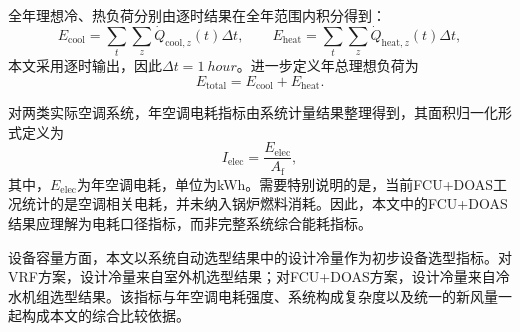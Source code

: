 全年理想冷、热负荷分别由逐时结果在全年范围内积分得到：
\begin{equation}
E_{\mathrm{cool}} = \sum_t \sum_z \dot{Q}_{\mathrm{cool},z}(t)\Delta t,
\qquad
E_{\mathrm{heat}} = \sum_t \sum_z \dot{Q}_{\mathrm{heat},z}(t)\Delta t,
\end{equation}
本文采用逐时输出，因此$\Delta t=\SI{1}{hour}$。进一步定义年总理想负荷为
\begin{equation}
E_{\mathrm{total}} = E_{\mathrm{cool}} + E_{\mathrm{heat}}.
\end{equation}

对两类实际空调系统，年空调电耗指标由系统计量结果整理得到，其面积归一化形式定义为
\begin{equation}
I_{\mathrm{elec}} = \frac{E_{\mathrm{elec}}}{A_{\mathrm{f}}},
\end{equation}
其中，$E_{\mathrm{elec}}$为年空调电耗，单位为\si{kWh}。需要特别说明的是，当前FCU+DOAS工况统计的是空调相关电耗，并未纳入锅炉燃料消耗。因此，本文中的FCU+DOAS结果应理解为电耗口径指标，而非完整系统综合能耗指标。

设备容量方面，本文以系统自动选型结果中的设计冷量作为初步设备选型指标。对VRF方案，设计冷量来自室外机选型结果；对FCU+DOAS方案，设计冷量来自冷水机组选型结果。该指标与年空调电耗强度、系统构成复杂度以及统一的新风量一起构成本文的综合比较依据。
